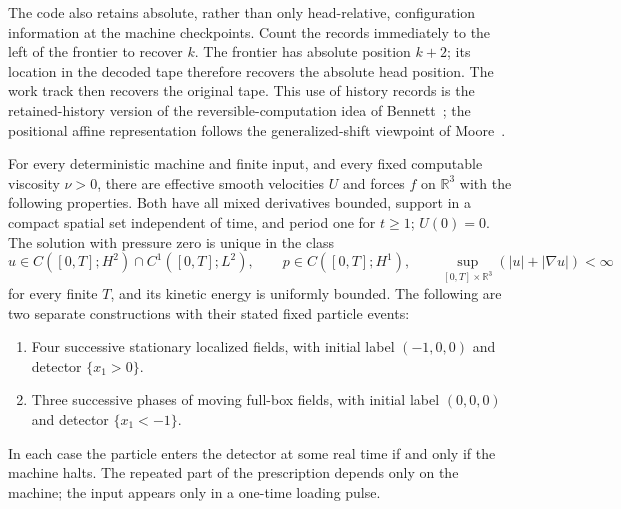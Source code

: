 The code also retains absolute, rather than only head-relative,
configuration information at the machine checkpoints. Count the records
immediately to the left of the frontier to recover $k$. The frontier
has absolute position $k+2$; its location in the decoded tape therefore
recovers the absolute head position. The work track then recovers the
original tape. This use of history records is the retained-history
version of the reversible-computation idea of Bennett~\cite{Bennett1973};
the positional affine representation follows the generalized-shift
viewpoint of Moore~\cite{Moore1990,Moore1991}.

\begin{proposition}
\label{prop:p2:rapid-periodic}
For every deterministic machine and finite input, and every fixed
computable viscosity $\nu>0$, there are effective smooth velocities
$U$ and forces $f$ on $\mathbb R^3$ with the following properties.
Both have all mixed derivatives bounded, support in a compact spatial
set independent of time, and period one for $t\ge1$; $U(0)=0$.
The solution with pressure zero is unique in the class
\[
 u\in C([0,T];H^2)\cap C^1([0,T];L^2),\qquad
 p\in C([0,T];H^1),\qquad
 \sup_{[0,T]\times\mathbb R^3}(|u|+|\nabla u|)<\infty
\]
for every finite $T$, and its kinetic energy is uniformly bounded.
The following are two separate constructions with their stated fixed
particle events:
\begin{enumerate}
\item Four successive stationary localized fields, with initial label
$(-1,0,0)$ and detector $\{x_1>0\}$.
\item Three successive phases of moving full-box fields, with initial
label $(0,0,0)$ and detector \mbox{$\{x_1<-1\}$}.
\end{enumerate}
In each case the particle enters the detector at some real time if and
only if the machine halts. The repeated part of the prescription depends
only on the machine; the input appears only in a one-time loading pulse.
\end{proposition}
